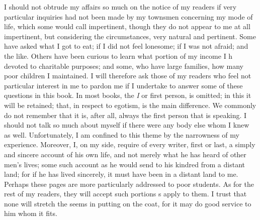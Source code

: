 I should not obtrude my affairs so much on the notice of my readers if
very particular inquiries had not been made by my townsmen concerning
my mode of life, which some would call impertinent, though they do
not appear to me at all impertinent, but considering the circumstances,
very natural and pertinent. Some have asked what I got to eat; if I did
not feel lonesome; if I was not afraid; and the like. Others have been
curious to learn what portion of my income I h devoted to charitable
purposes; and some, who have large families, how many poor children I
maintained. I will therefore ask those of my readers who feel not
particular interest in me to pardon me if I undertake to answer some of
these questions in this book. In most books, the {\sl I} or first
person, is omitted; in this it will be retained; that, in respect to
egotism, is the main difference. We commonly do not remember that it
is, after all, always the first person that is speaking. I should not
talk so much about myself if there were any body else whom I knew as
well. Unfortunately, I am confined to this theme by the narrowness
of my experience. Moreover, I, on my side, require of every writer,
first or last, a simply and sincere account of his own life, and not
merely what he has heard of other men's lives; some such account as
he would send to his kindred from a distant land; for if he has lived
sincerely, it must have been in a distant land to me. Perhaps these
pages are more particularly addressed to poor students. As for the
rest of my readers, they will accept such portions s apply to them. I
trust that none will stretch the seems in putting on the coat, for it
may do good service to him whom it fits.\par
